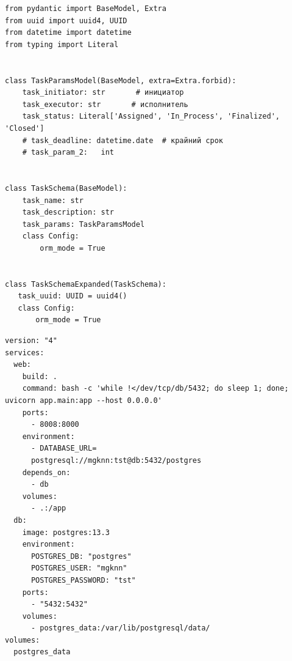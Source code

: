 \documentclass{altsu-report}
\begin{document}
\begin{code}
\label{code:pi-example}
\begin{verbatim}
from pydantic import BaseModel, Extra
from uuid import uuid4, UUID
from datetime import datetime
from typing import Literal


class TaskParamsModel(BaseModel, extra=Extra.forbid):
    task_initiator: str       # инициатор
    task_executor: str       # исполнитель
    task_status: Literal['Assigned', 'In_Process', 'Finalized', 'Closed']
    # task_deadline: datetime.date  # крайний срок
    # task_param_2:   int


class TaskSchema(BaseModel):
    task_name: str
    task_description: str
    task_params: TaskParamsModel
    class Config:
        orm_mode = True


class TaskSchemaExpanded(TaskSchema):
   task_uuid: UUID = uuid4()
   class Config:
       orm_mode = True
\end{verbatim}
\end{code}

\begin{code}
\label{code:pi-example}
\begin{verbatim}
version: "4"
services:
  web:
    build: .
    command: bash -c 'while !</dev/tcp/db/5432; do sleep 1; done; uvicorn app.main:app --host 0.0.0.0'
    ports:
      - 8008:8000
    environment:
      - DATABASE_URL=
      postgresql://mgknn:tst@db:5432/postgres
    depends_on:
      - db
    volumes:
      - .:/app
  db:
    image: postgres:13.3
    environment:
      POSTGRES_DB: "postgres"
      POSTGRES_USER: "mgknn"
      POSTGRES_PASSWORD: "tst"
    ports:
      - "5432:5432"
    volumes:
      - postgres_data:/var/lib/postgresql/data/
volumes:
  postgres_data
\end{verbatim}
\end{code}

\end{document}
